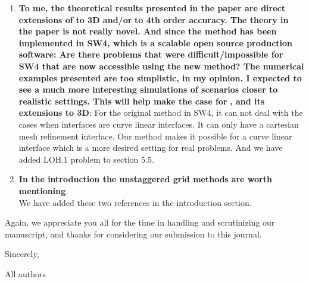 \documentclass[twoside,11pt]{article}
\begin{document}
\begin{enumerate}
\item  \textbf{To me, the theoretical results presented in the paper are direct extensions of} \cite{wang2019fourth} \textbf{to 3D and/or} \cite{petersson2009stable} \textbf{to 4th order accuracy. The theory in the paper is not really novel. And since the method has been implemented in SW4, which is a scalable open source production software: Are there problems that were difficult/impossible for SW4 that are now accessible using the new method? The numerical examples presented are too simplistic, in my opinion. I expected to see a much more interesting simulations of scenarios closer to realistic settings. This will help make the case for} \cite{wang2019fourth}\textbf{, and its extensions to 3D}: For the original method in SW4, it can not deal with the cases when interfaces are curve linear interfaces. It can only have a cartesian mesh refinement interface. Our method makes it possible for a curve linear interface which is a more desired setting for real problems. And we have added LOH.1 problem to section 5.5.

\item \textbf{In the introduction the unstaggered grid methods} \cite{kozdon2013simulation,duru2016dynamic} \textbf{are worth mentioning}.\\
We have added these two references in the introduction section.

\end{enumerate}

Again, we appreciate you all for the time in handling and scrutinizing our manuscript, and thanks for considering our submission to this journal.

Sincerely, 

All authors



\end{document}
